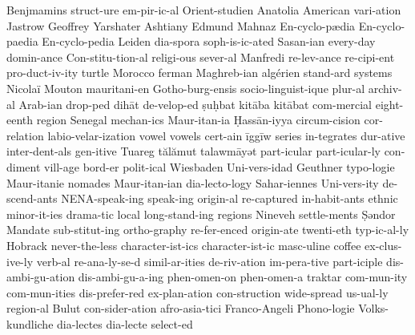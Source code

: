 {Benjmamins
struct-ure
em-pir-ic-al
Orient-studien
Anatolia
American
vari-ation
Jastrow
Geoffrey
Yarshater
Ashtiany
Edmund
Mahnaz
En-cyclo-pædia
En-cyclo-paedia
En-cyclo-pedia
Leiden
dia-spora
soph-is-ic-ated
Sasan-ian
every-day
domin-ance
Con-stitu-tion-al
religi-ous
sever-al
Manfredi
re-lev-ance
re-cipi-ent
pro-duct-iv-ity
turtle
Morocco
ferman
Maghreb-ian
algérien
stand-ard
systems
Nicolaï
Mouton
mauritani-en
Gotho-burg-ensis
socio-linguist-ique
plur-al
archiv-al
Arab-ian
drop-ped
dihāt
de-velop-ed
ṣuḥbat
kitāba
kitābat
com-mercial
eight-eenth
region
Senegal
mechan-ics
Maur-itan-ia
Ḥassān-iyya
circum-cision
cor-relation
labio-velar-ization
vowel
vowels
cert-ain
īggīw
series
in-tegrates
dur-ative
inter-dent-als
gen-itive
Tuareg
tălămut
talawmāyət
part-icular
part-icular-ly
con-diment
vill-age
bord-er
polit-ical
Wiesbaden
Uni-vers-idad
Geuthner
typo-logie
Maur-itanie
nomades
Maur-itan-ian
dia-lecto-logy
Sahar-iennes
Uni-vers-ity
de-scend-ants
NENA-speak-ing
speak-ing
origin-al
re-captured
in-habit-ants
ethnic
minor-it-ies
drama-tic
local
long-stand-ing
regions
Nineveh
settle-ments
Ṣəndor
Mandate
sub-stitut-ing
ortho-graphy
re-fer-enced
origin-ate
twenti-eth
typ-ic-al-ly
Hobrack
never-the-less
character-ist-ics
character-ist-ic
masc-uline
coffee
ex-clus-ive-ly
verb-al
re-ana-ly-se-d
simil-ar-ities
de-riv-ation
im-pera-tive
part-iciple
dis-ambi-gu-ation
dis-ambi-gu-a-ing
phen-omen-on
phen-omen-a
traktar
com-mun-ity
com-mun-ities
dis-prefer-red
ex-plan-ation
con-struction
wide-spread
us-ual-ly
region-al
Bulut
con-sider-ation
afro-asia-tici
Franco-Angeli
Phono-logie
Volks-kundliche
dia-lectes
dia-lecte
select-ed
}